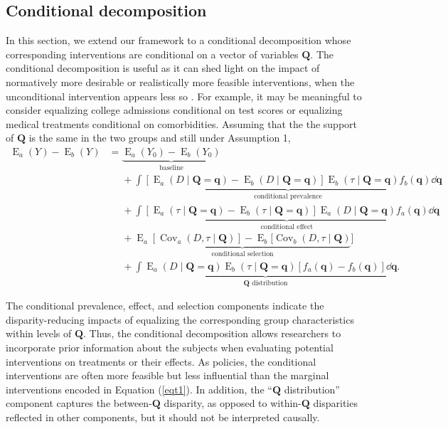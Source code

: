 \documentclass[12pt,a4paper]{article}
\newcommand{\Cov}{\operatorname{Cov}}
\newcommand{\E}{\operatorname{E}}
\def\Q{{\boldsymbol Q}}
\def\q{{\boldsymbol q}}
\begin{document}
\subsection{Conditional decomposition}
In this section, we extend our framework to a conditional decomposition whose corresponding interventions are conditional on a vector of variables $\boldsymbol{Q}$. The conditional decomposition is useful as it can shed light on the impact of normatively more desirable or realistically more feasible interventions, when the unconditional intervention appears less so \citep{jackson_meaningful_2021}. For example, it may be meaningful to consider equalizing college admissions conditional on test scores or equalizing medical treatments conditional on comorbidities.
Assuming that the the support of $\Q$ is the same in the two groups and still under Assumption 1,
\begin{align}
    \E_a(Y)-\E_b(Y) &= \underbrace{\E_a(Y_0)-\E_b(Y_0)}_{\text{baseline}} \nonumber \\
    &\phantom{{}={}} + \underbrace{\int [\E_a(D \mid \Q=\q)-\E_b(D \mid \Q=\q)]\E_b(\tau \mid \Q=\q) f_b(\q) \dd \q}_{\text{conditional prevalence}} \nonumber \\
    &\phantom{{}={}} + \underbrace{\int [\E_a(\tau \mid \Q=\q)-\E_b(\tau \mid \Q=\q)] \E_a(D \mid \Q=\q) f_a(\q) \dd \q}_{\text{conditional effect}} \nonumber \\
    &\phantom{{}={}} + \underbrace{\E_a[\Cov_a(D, \tau \mid \Q)] - \E_b[\Cov_b(D, \tau \mid \Q)}_{\text{conditional selection}}] \nonumber \\
    &\phantom{{}={}} + \underbrace{\int \E_a(D \mid \Q=\q) \E_b(\tau \mid \Q=\q) [f_a(\q)-f_b(\q)] \dd \q}_{\text{$\Q$ distribution}}.
\end{align}

The conditional prevalence, effect, and selection components indicate the disparity-reducing impacts of equalizing the corresponding group characteristics within levels of $\Q$. Thus, the conditional decomposition allows researchers to incorporate prior information about the subjects when evaluating potential interventions on treatments or their effects. As policies, the conditional interventions are often more feasible but less influential than the marginal interventions encoded in Equation (\ref{eqt1}). In addition, the ``$\Q$ distribution'' component captures the between-$\Q$ disparity, as opposed to within-$\Q$ disparities reflected in other components, but it should not be interpreted causally.
\end{document}
